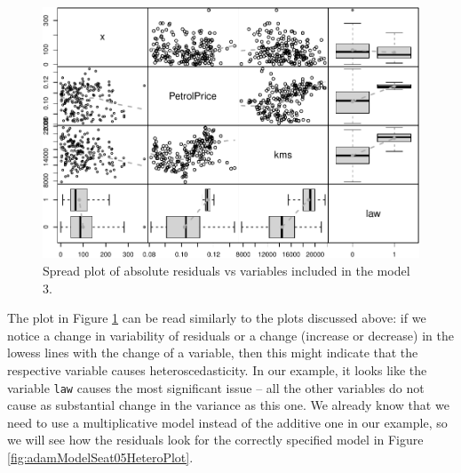 \documentclass[
]{book}
\newenvironment{Shaded}{\begin{snugshade}}{\end{snugshade}}
\newcommand{\AttributeTok}[1]{\textcolor[rgb]{0.77,0.63,0.00}{#1}}
\newcommand{\ConstantTok}[1]{\textcolor[rgb]{0.00,0.00,0.00}{#1}}
\newcommand{\DecValTok}[1]{\textcolor[rgb]{0.00,0.00,0.81}{#1}}
\newcommand{\FunctionTok}[1]{\textcolor[rgb]{0.00,0.00,0.00}{#1}}
\newcommand{\NormalTok}[1]{#1}
\newcommand{\SpecialCharTok}[1]{\textcolor[rgb]{0.00,0.00,0.00}{#1}}
\theoremstyle{definition}
\theoremstyle{definition}
\theoremstyle{definition}
\theoremstyle{definition}
\theoremstyle{remark}
\begin{document}
\begin{Shaded}
\end{Shaded}

\begin{figure}
\centering
\includegraphics{Svetunkov--2022----ADAM_files/figure-latex/adamModelSeat03Spread-1.pdf}
\caption{\label{fig:adamModelSeat03Spread}Spread plot of absolute residuals vs variables included in the model 3.}
\end{figure}

The plot in Figure \ref{fig:adamModelSeat03Spread} can be read similarly to the plots discussed above: if we notice a change in variability of residuals or a change (increase or decrease) in the lowess lines with the change of a variable, then this might indicate that the respective variable causes heteroscedasticity. In our example, it looks like the variable \texttt{law} causes the most significant issue -- all the other variables do not cause as substantial change in the variance as this one. We already know that we need to use a multiplicative model instead of the additive one in our example, so we will see how the residuals look for the correctly specified model in Figure \ref{fig:adamModelSeat05HeteroPlot}.
\end{document}
